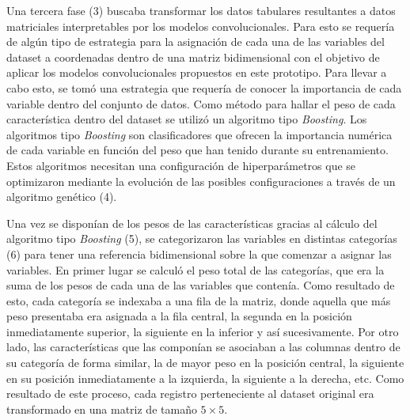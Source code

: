 Una tercera fase (3) buscaba transformar los datos tabulares resultantes a datos matriciales interpretables por los modelos convolucionales. Para esto se requería de algún tipo de estrategia para la asignación de cada una de las variables del dataset a coordenadas dentro de una matriz bidimensional con el objetivo de aplicar los modelos convolucionales propuestos en este prototipo. Para llevar a cabo esto, se tomó una estrategia que requería de conocer la importancia de cada variable dentro del conjunto de datos. Como método para hallar el peso de cada característica dentro del dataset se utilizó un algoritmo tipo \textit{Boosting}. Los algoritmos tipo \textit{Boosting} son clasificadores que ofrecen la importancia numérica de cada variable en función del peso que han tenido durante su entrenamiento. Estos algoritmos necesitan una configuración de hiperparámetros que se optimizaron mediante la evolución de las posibles configuraciones a través de un algoritmo genético (4).

Una vez se disponían de los pesos de las características gracias al cálculo del algoritmo tipo \textit{Boosting} (5), se categorizaron las variables en distintas categorías (6) para tener una referencia bidimensional sobre la que comenzar a asignar las variables. En primer lugar se calculó el peso total de las categorías, que era la suma de los pesos de cada una de las variables que contenía. Como resultado de esto, cada categoría se indexaba a una fila de la matriz, donde aquella que más peso presentaba era asignada a la fila central, la segunda en la posición inmediatamente superior, la siguiente en la inferior y así sucesivamente. Por otro lado, las características que las componían se asociaban a las columnas dentro de su categoría de forma similar, la de mayor peso en la posición central, la siguiente en su posición inmediatamente a la izquierda, la siguiente a la derecha, etc. Como resultado de este proceso, cada registro perteneciente al dataset original era transformado en una matriz de tamaño $5\times5$.

